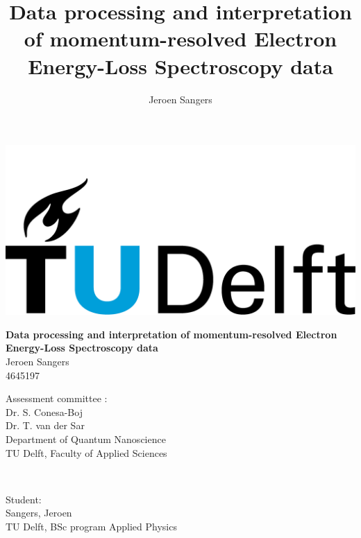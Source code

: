\begin{titlepage}

\title{ \huge \bfseries Data processing and interpretation of momentum-resolved Electron Energy-Loss Spectroscopy data  }
\author{Jeroen Sangers}

\maketitle

\thispagestyle{empty}

\vspace{10cm}

\begin{center}
    \includegraphics[width=0.4\linewidth,keepaspectratio]{Resources/Figures/titlepage/TUD.png}
\end{center}

\afterpage{\blankpage}

\end{titlepage}

\newpage

\begin{center}




 { \huge \bfseries Data processing and interpretation of momentum-resolved
 Electron Energy-Loss Spectroscopy data  }\\[3cm]

 { Jeroen Sangers}\\
 { 4645197}\\

\vfill
\begin{minipage}{0.45\linewidth}
    \begin{flushleft}
        Assessment committee :\\
        Dr. S. Conesa-Boj\\
        Dr. T. van der Sar\\
        Department of Quantum Nanoscience\\
        TU Delft, Faculty of Applied Sciences
    \end{flushleft}
\end{minipage}
~
\begin{minipage}{0.45\linewidth}
    \begin{flushleft}
        Student:\\
        Sangers, Jeroen\\
        TU Delft, BSc program Applied Physics \\
    \end{flushleft}
\end{minipage}\\[1.5cm]

\end{center}
